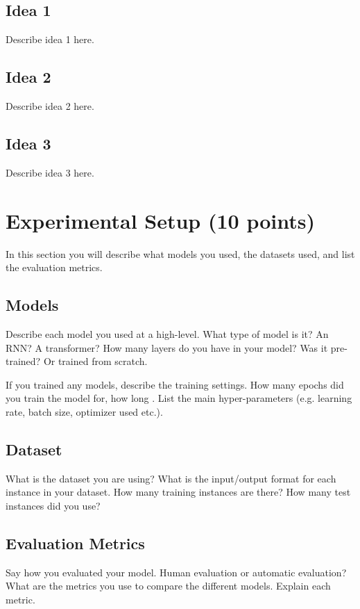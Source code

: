 \documentclass[11pt,a4paper]{article}
\begin{document}
\subsection{Idea 1}

Describe idea 1 here. 

\subsection{Idea 2}

Describe idea 2 here.

\subsection{Idea 3}

Describe idea 3 here.

\section{Experimental Setup (10 points)}

In this section you will describe what models you used, the datasets used, and list the evaluation metrics. 

\subsection{Models}
Describe each model you used at a high-level. What type of model is it? An RNN? A transformer? How many layers do you have in your model? Was it pre-trained? Or trained from scratch. 

If you trained any models, describe the training settings. How many epochs did you train the model for, how long . List the main hyper-parameters (e.g. learning rate, batch size, optimizer used etc.). 

\subsection{Dataset} What is the dataset you are using? What is the input/output format for each instance in your dataset. How many training instances are there? How many test instances did you use?

\subsection{Evaluation Metrics} Say how you evaluated your model. Human evaluation or automatic evaluation? What are the metrics you use to compare the different models. Explain each metric. 
\end{document}
